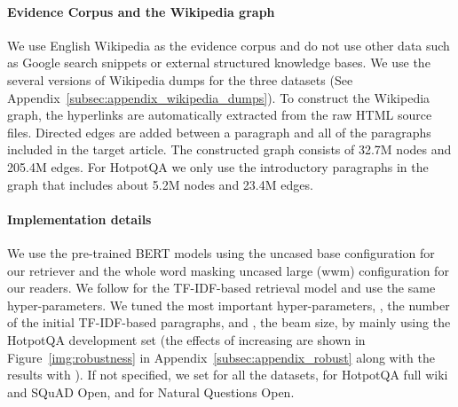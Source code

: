 \documentclass{article} \usepackage{iclr2020_conference,times}
\begin{document}
\vspace{-2mm}\paragraph{Evidence Corpus and the Wikipedia graph}
We use English Wikipedia as the evidence corpus and do not use other data such as Google search snippets or external structured knowledge bases. 
We use the several versions of Wikipedia dumps for the three datasets (See Appendix~\ref{subsec:appendix_wikipedia_dumps}). 
To construct the Wikipedia graph, the hyperlinks are automatically extracted from the raw HTML source files. 
Directed edges are added between a paragraph  and all of the paragraphs included in the target article. 
The constructed graph consists of 32.7M nodes and 205.4M edges. 
For HotpotQA we only use the introductory paragraphs in the graph that includes about 5.2M nodes and 23.4M edges. 

\vspace{-2mm}\paragraph{Implementation details}
We use the pre-trained BERT models \citep{devlin2018bert} using the uncased base configuration  for our retriever and the whole word masking uncased large (wwm) configuration  for our readers.
We follow \cite{chen2017reading} for the TF-IDF-based retrieval model and use the same hyper-parameters.
We tuned the most important hyper-parameters, , the number of the initial TF-IDF-based paragraphs, and , the beam size, by mainly using the HotpotQA development set (the effects of increasing  are shown in Figure~\ref{img:robustness} in Appendix~\ref{subsec:appendix_robust} along with the results with ).
If not specified, we set  for all the datasets,  for HotpotQA full wiki and SQuAD Open, and  for Natural Questions Open.
\end{document}
